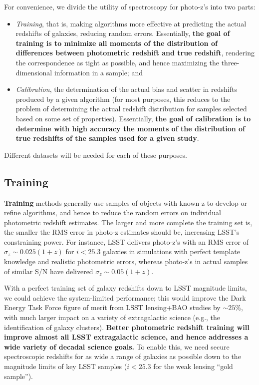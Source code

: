 For convenience, we divide the utility of spectroscopy for photo-z's into two parts: 
\begin{itemize}
\item {\it Training}, that is, making algorithms more effective at predicting the actual redshifts of galaxies, reducing random errors.  Essentially, {\bf the goal of training is to minimize all moments of the distribution of differences between photometric redshift and true redshift}, rendering the correspondence as tight as possible, and hence maximizing the three-dimensional information in a sample; and 

\item {\it Calibration}, the determination of the actual bias and scatter in redshifts produced by a given algorithm (for most purposes, this reduces to the problem of determining the actual redshift distribution for samples selected based on some set of properties).  Essentially, {\bf the goal of calibration is to determine with high accuracy the moments of the distribution of true redshifts of the samples used for a given study}.  
\end{itemize}
Different datasets will be needed for each of these purposes.

\subsection{Training}

{\bf Training} methods generally use samples of objects with known z to develop or refine algorithms, and hence to reduce the random errors on individual photometric redshift estimates. The larger and more complete the training set is, the smaller the RMS error in photo-z estimates should be, increasing LSST's constraining power.  For instance, LSST delivers photo-z's with an RMS error of $\sigma_z \sim 0.025(1+z)$ for $i<25.3$ galaxies in simulations with perfect template knowledge and realistic photometric errors, whereas photo-z's in actual samples of similar S/N have delivered $\sigma_z \sim 0.05(1+z)$. 

With a perfect training set of galaxy redshifts down to LSST magnitude limits, we could achieve the system-limited performance; this would improve the Dark Energy Task Force figure of merit from LSST lensing+BAO studies by $\sim25$\%, with much larger impact on a variety of extragalactic science (e.g., the identification of galaxy clusters).  {\bf Better photometric redshift training will improve almost all LSST extragalactic science, and hence addresses a wide variety of decadal science goals.}  To enable this, we need secure spectroscopic redshifts for as wide a range of galaxies as possible down to the magnitude limits of key LSST samples ($i<25.3$ for the weak lensing ``gold sample'').

